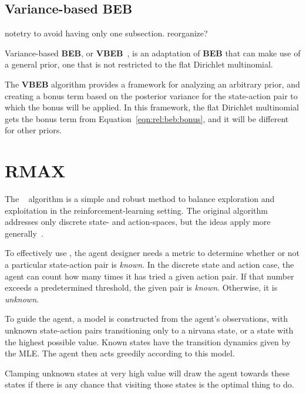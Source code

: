 \subsection{Variance-based BEB}

note{try to avoid having only one subsection.  reorganize?}

Variance-based {\bf BEB}, or {\bf VBEB}~\cite{sorg10}, is an adaptation of {\bf BEB} that can make use of a general prior, one that is not restricted to the flat Dirichlet multinomial.

The {\bf VBEB} algorithm provides a framework for analyzing an arbitrary prior, and creating a bonus term based on the posterior variance for the state-action pair to which the bonus will be applied. In this framework, the flat Dirichlet multinomial gets the bonus term from Equation~\ref{eqn:rel:beb:bonus}, and it will be different for other priors.




\section{RMAX}

The ~\cite{brafman03} algorithm is a simple and robust method to balance exploration and exploitation in the reinforcement-learning setting. The original algorithm addresses only discrete state- and action-spaces, but the ideas apply more generally~\cite{nouri09,jong07}.

To effectively use , the agent designer needs a metric to determine whether or not a particular state-action pair is \emph{known}. In the discrete state and action case, the agent can count how many times it has tried a given action pair. If that number exceeds a predetermined threshold, the given pair is \emph{known}. Otherwise, it is \emph{unknown}.

To guide the  agent, a model is constructed from the agent's observations, with unknown state-action pairs transitioning only to a nirvana state, or a state with the highest possible value. Known states have the transition dynamics given by the MLE. The agent then acts greedily according to this model.

Clamping unknown states at very high value will draw the agent towards these states if there is any chance that visiting those states is the optimal thing to do.

